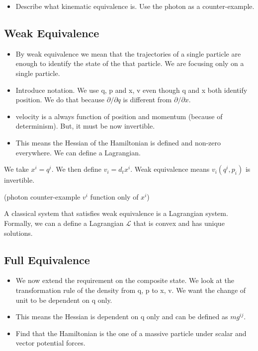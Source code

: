 \documentclass{article}
\begin{document}
\begin{itemize}
	\item Describe what kinematic equivalence is. Use the photon as a counter-example.
\end{itemize}

\subsection{Weak Equivalence}

\begin{itemize}
	\item By weak equivalence we mean that the trajectories of a single particle are enough to identify the state of the that particle. We are focusing only on a single particle.
	
	\item Introduce notation. We use q, p and x, v even though q and x both identify position. We do that because $\partial/\partial q$ is different from $\partial / \partial x$.
	
	\item velocity is a always function of position and momentum (because of determinism). But, it must be now invertible.
	
	\item This means the Hessian of the Hamiltonian is defined and non-zero everywhere. We can define a Lagrangian.
\end{itemize}

\begin{defn}
	We take $x^i = q^i$. We then define $v_i = d_tx^i$. Weak equivalence means $v_i(q^i, p_i)$ is invertible.
\end{defn}

(photon counter-example $v^i$ function only of $x^i$)

\begin{prop}
	A classical system that satisfies weak equivalence is a Lagrangian system. Formally, we can a define a Lagrangian $\mathcal{L}$ that is convex and has unique solutions.
\end{prop}

\subsection{Full Equivalence}

\begin{itemize}
	\item We now extend the requirement on the composite state. We look at the transformation rule of the density from q, p to x, v. We want the change of unit to be dependent on q only.
	
	\item This means the Hessian is dependent on q only and can be defined as $m g^{ij}$.
	
	\item Find that the Hamiltonian is the one of a massive particle under scalar and vector potential forces.
\end{itemize}
\end{document}
